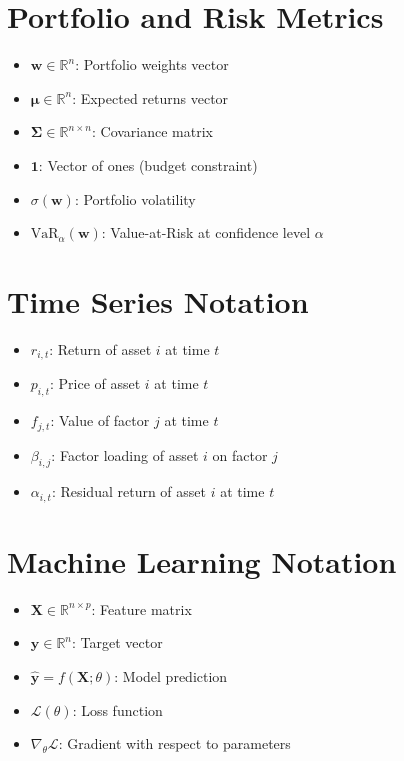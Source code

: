 \documentclass[11pt,letterpaper,openany]{book}
\newcommand{\R}{\mathbb{R}}
\newcommand{\VaR}{\mathrm{VaR}}
\begin{document}
\section*{Portfolio and Risk Metrics}
\begin{itemize}
    \item $\mathbf{w} \in \R^n$: Portfolio weights vector
    \item $\boldsymbol{\mu} \in \R^n$: Expected returns vector
    \item $\boldsymbol{\Sigma} \in \R^{n \times n}$: Covariance matrix
    \item $\mathbf{1}$: Vector of ones (budget constraint)
    \item $\sigma(\mathbf{w})$: Portfolio volatility
    \item $\VaR_\alpha(\mathbf{w})$: Value-at-Risk at confidence level $\alpha$
\end{itemize}

\section*{Time Series Notation}
\begin{itemize}
    \item $r_{i,t}$: Return of asset $i$ at time $t$
    \item $p_{i,t}$: Price of asset $i$ at time $t$
    \item $f_{j,t}$: Value of factor $j$ at time $t$
    \item $\beta_{i,j}$: Factor loading of asset $i$ on factor $j$
    \item $\alpha_{i,t}$: Residual return of asset $i$ at time $t$
\end{itemize}

\section*{Machine Learning Notation}
\begin{itemize}
    \item $\mathbf{X} \in \R^{n \times p}$: Feature matrix
    \item $\mathbf{y} \in \R^n$: Target vector
    \item $\hat{\mathbf{y}} = f(\mathbf{X}; \theta)$: Model prediction
    \item $\mathcal{L}(\theta)$: Loss function
    \item $\nabla_\theta \mathcal{L}$: Gradient with respect to parameters
\end{itemize}
\end{document}
